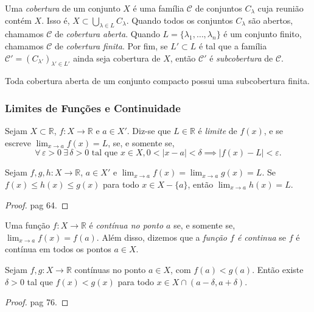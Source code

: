 \begin{definicao}[Cobertura]
	Uma \textit{cobertura} de um conjunto $X$ é uma família $\mathcal{C}$ de conjuntos $C_\lambda$ cuja reunião contém $X$. Isso é, $X \subset \bigcup_{\lambda\in L}C_\lambda$. Quando todos os conjuntos $C_\lambda$ são abertos, chamamos $\mathcal{C}$ de \textit{cobertura aberta}. Quando $L=\{\lambda_1,\dots,\lambda_n\}$ é um conjunto finito, chamamos $\mathcal{C}$ de \textit{cobertura finita}. Por fim, se $L'\subset L$ é tal que a família $\mathcal{C}' = (C_{\lambda'})_{\lambda'\in L'}$ ainda seja cobertura de $X$, então $\mathcal{C}'$ é \textit{subcobertura} de $\mathcal{C}$.
\end{definicao}

\begin{teorema}
	Toda cobertura aberta de um conjunto compacto possui uma subcobertura finita.
\end{teorema}

\subsubsection{Limites de Funções e Continuidade}
\begin{definicao}[Limite]
	Sejam $X\subset \mathbb{R}$, $f:X\to \mathbb{R}$ e $a\in X'$. Diz-se que $L\in \mathbb{R}$ é \textit{limite} de $f(x)$, e se escreve $\lim_{x\to a}f(x) = L$, se, e somente se, $$\forall\,\varepsilon>0\ \exists\,\delta>0 \text{ tal que } x\in X, 0<|x-a|<\delta \implies |f(x)-L|<\varepsilon.$$
\end{definicao}

\begin{teorema}[Sanduíche]
	Sejam $f,g,h: X\to \mathbb{R}$, $a\in X'$ e $\lim_{x\to a}f(x) = \lim_{x\to a}g(x) = L$. Se $f(x)\leq h(x) \leq g(x)$ para todo $x\in X-\{a\}$, então $\lim_{x\to a}h(x) = L$.
	\begin{proof}
		\cite{elonAnalise1} pag 64.
	\end{proof}
\end{teorema}

\begin{definicao}
	Uma função $f:X \to \mathbb{R}$ é \textit{contínua no ponto $a$} se, e somente se, $\lim_{x\to a}f(x) = f(a)$. Além disso, dizemos que a \textit{função $f$ é continua} se $f$ é contínua em todos os pontos $a\in X$. 
\end{definicao}

\begin{proposicao}
	Sejam $f,g: X \to \mathbb{R}$ contínuas no ponto $a\in X$, com $f(a) < g(a)$. Então existe $\delta>0$ tal que $f(x)<g(x)$ para todo $x\in X\cap (a-\delta,a+\delta)$.
	\begin{proof}
		\cite{elonAnalise1} pag 76.
	\end{proof}
\end{proposicao}

